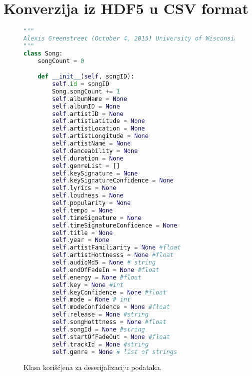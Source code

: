 \section{Konverzija iz HDF5 u CSV format}
\label{sec:DodatakIzvlacenje}

\begin{figure}[h]
\lstset{style=mystyle}
\begin{lstlisting}[language=Python, basicstyle=\footnotesize]
"""
Alexis Greenstreet (October 4, 2015) University of Wisconsin-Madison
"""
class Song:
    songCount = 0

    def __init__(self, songID):
        self.id = songID
        Song.songCount += 1
        self.albumName = None
        self.albumID = None
        self.artistID = None
        self.artistLatitude = None
        self.artistLocation = None
        self.artistLongitude = None
        self.artistName = None
        self.danceability = None
        self.duration = None
        self.genreList = []
        self.keySignature = None
        self.keySignatureConfidence = None
        self.lyrics = None
        self.loudness = None
        self.popularity = None
        self.tempo = None
        self.timeSignature = None
        self.timeSignatureConfidence = None
        self.title = None
        self.year = None
        self.artistFamiliarity = None #float
        self.artistHottnesss = None #float
        self.audioMd5 = None # string
        self.endOfFadeIn = None #float
        self.energy = None #float
        self.key = None #int
        self.keyConfidence = None #float
        self.mode = None # int
        self.modeConfidence = None #float
        self.release = None #string
        self.songHotttness = None #float
        self.songId = None #string
        self.startOfFadeOut = None #float
        self.trackId = None #string
        self.genre = None # list of strings
\end{lstlisting}
\label{code:SongClass}
\caption{Klasa kori\v{s}\'c{]ena za deserijalizaciju podataka.}}
\end{figure}

